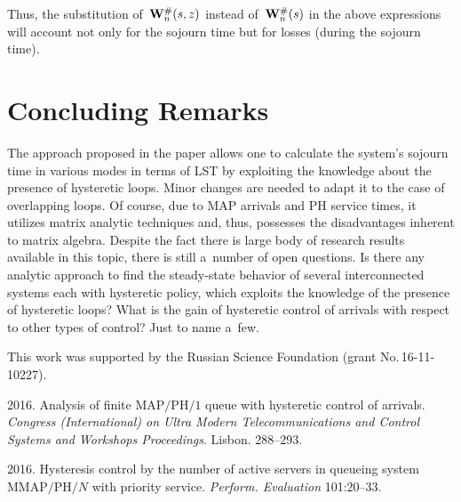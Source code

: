 \begin{multicols}{2}
\noindent Thus, the substitution of~$\mathbf{W}^{\#}_n(s,z)$ 
instead of~$\mathbf{W}^{\#}_n(s)$ in the above expressions
will account not only for the sojourn time but for losses
(during the sojourn time). 



\section{Concluding Remarks}

\noindent
The approach proposed in the paper allows one to calculate
the system's sojourn time in various modes 
in terms of LST by exploiting the knowledge
about the presence of hysteretic loops. 
Minor changes are needed to adapt it to the case of overlapping loops. 
Of course, due to MAP arrivals and PH service times, it
utilizes matrix analytic techniques and, thus, possesses
the disadvantages inherent to matrix algebra.
Despite the fact there is large body of research results 
available in this topic, 
there is still a~number of open questions.
Is there any analytic approach to find the steady-state
behavior of several interconnected systems each with hysteretic policy, 
which exploits the knowledge of the presence of hysteretic loops?
What is the gain of hysteretic control of arrivals with
respect to other types of control? Just to name a~few.

\vspace*{-4pt}


\Ack
\noindent
This work was supported by the Russian Science Foundation (grant No.\,16-11-10227).

\renewcommand{\bibname}{\protect\rmfamily References}

\vspace*{-4pt}


{\small\frenchspacing
{%
\begin{thebibliography}{9}

 2016. Analysis of finite ${\mathrm{MAP}/\mathrm{PH}/1}$ 
queue with hysteretic control of arrivals.
\textit{Congress (International)
on Ultra Modern Telecommunications and Control Systems and Workshops Proceedings}.
 Lisbon. 288--293.



 2016.
Hysteresis control by the number of active servers in queueing system ${\mathrm{MMAP}/\mathrm{PH}/N}$
with priority service. \textit{Perform. Evaluation} 101:20--33.


\end{thebibliography}}}
\end{multicols}
